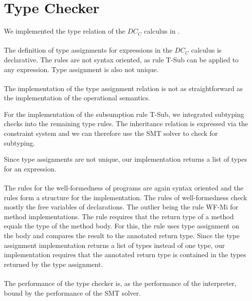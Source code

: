 \section{Type Checker}
We implemented the type relation of the $DC_C$ calculus
in .\\
\\
The definition of type assignments for expressions
in the $DC_C$ calculus is declarative.
The rules are not syntax oriented,
as rule T-Sub can be applied to any expression.
Type assignment is also not unique.\\
\\
The implementation of the type assignment relation
is not as straightforward as the implementation
of the operational semantics.

For the implementation of the subsumption rule T-Sub,
we integrated subtyping checks into the remaining type rules.
The inheritance relation is expressed via the constraint system
and we can therefore use the SMT solver to check for subtyping.

Since type assignments are not unique,
our implementation returns a list of types for
an expression.\\
\\
The rules for the well-formedness of programs are
again syntax oriented
and the rules form a structure for the implementation.
The rules of well-formedness check mostly the free variables
of declarations.
The outlier being the rule WF-Mi for method implementations.
The rule requires that the return type of a method
equals the type of the method body.
For this, the rule uses type assignment on the body
and compares the result to the annotated return type.
Since the type assignment implementation
returns a list of types instead of one type,
our implementation requires that the annotated return type
is contained in the types returned by the type assignment.\\
\\
The performance of the type checker is,
as the performance of the interpreter,
bound by the performance of the SMT solver.
%

